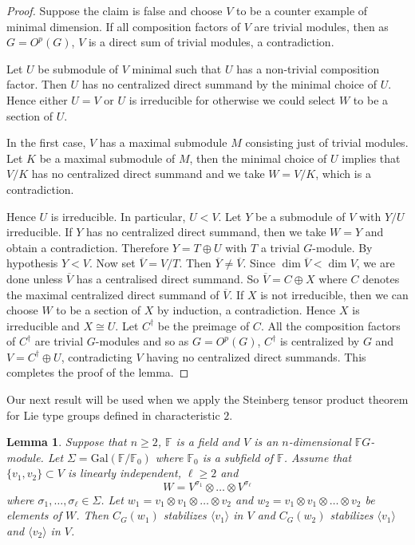 \documentclass[12pt]{amsart}
\newtheorem{lemma}[theorem]{Lemma}
\theoremstyle{remark}
\theoremstyle{notation}
\theoremstyle{definition}
\newcommand{\0}{\emptyset}
\begin{document}
 \begin{proof}Suppose the claim is false and choose $V$ to be a counter example of minimal dimension.  If all composition factors of $V$ are trivial modules, then as $G=O^p(G)$, $V$ is a direct sum of trivial modules, a contradiction.



 Let $U$ be   submodule of $V$ minimal such that $U$ has a non-trivial composition factor. Then $U$ has no centralized direct summand by the minimal choice of $U$.  Hence either $U=V$ or $U$ is irreducible for otherwise we could select $W$ to be a section of $U$.

 In the first case, $V$ has a maximal submodule $M$ consisting just of trivial modules. Let $K$ be a maximal  submodule of $M$, then the minimal choice of $U$ implies that $V/K$ has no centralized direct summand and we take $W= V/K$, which is a contradiction.

 Hence $U$ is irreducible.  In particular, $U<V$.
Let $Y$ be a submodule of $V$ with  $Y/U$ irreducible. If $Y$ has no centralized direct summand, then we take $W=Y$ and obtain a contradiction. Therefore $Y =T \oplus U$ with $T$ a trivial $G$-module. By hypothesis $Y<V$. Now set $\overline V = V/T$. Then $\overline Y \ne \overline V$. Since $\dim \overline V < \dim V$, we are done unless $\overline V$ has a centralised direct summand. So $\overline V = C\oplus X$ where $C$ denotes the maximal centralized direct summand of $\overline V$. If $X$ is not irreducible, then we can choose $W$ to be a section of $X$ by induction, a contradiction. Hence $X$ is irreducible and $X \cong U$. Let $C^\dagger$ be the preimage of $C$. All the composition factors of $C^\dagger$ are trivial $G$-modules and so as $G=O^p(G)$, $C^\dagger$ is centralized by $G$ and $V= C^\dagger \oplus U$, contradicting $V$ having no centralized direct summands. This completes the proof of the lemma.
 \end{proof}






Our next result will be used when we apply the Steinberg tensor product theorem for Lie type groups defined in characteristic $2$.




\begin{lemma}\label{lem:no tensors}
Suppose that $n \ge 2$,  $\mathbb F $ is a field and $V$ is an $n$-dimensional $\mathbb FG$-module. Let $\Sigma= \mathrm{Gal}(\mathbb F/\mathbb F_0)$ where $\mathbb F_0$ is a subfield of $\mathbb F$.
 Assume that $\{v_1, v_2 \} \subset V$ is linearly independent,   $\ell \ge 2$ and  $$W= V^{\sigma_1}\otimes \dots  \otimes V^{\sigma_\ell}$$ where $\sigma_1,\dots, \sigma_\ell\in \Sigma$. Let $w_1= v_1 \otimes v_1\otimes \dots\otimes v_2$ and $w_2= v_1 \otimes v_1\otimes \dots\otimes v_2$ be elements of $W$.
Then $C_G(w_1)$ stabilizes $\langle v_1\rangle$ in $V$ and    $C_G(w_2)$ stabilizes $\langle v_1\rangle$ and $\langle v_2\rangle$ in $V$.
\end{lemma}
\end{document}
